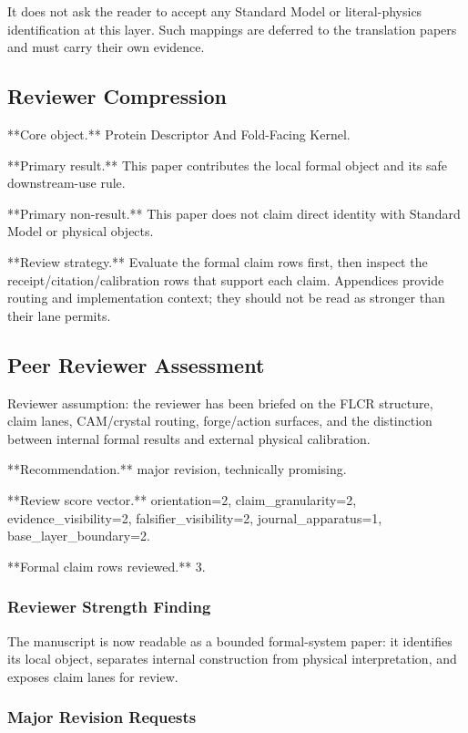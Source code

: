 \documentclass[11pt]{article}
\begin{document}
It does not ask the reader to accept any Standard Model or literal-physics identification at this layer. Such mappings are deferred to the translation papers and must carry their own evidence.

\subsection*{Reviewer Compression}

**Core object.** Protein Descriptor And Fold-Facing Kernel.

**Primary result.** This paper contributes the local formal object and its safe downstream-use rule.

**Primary non-result.** This paper does not claim direct identity with Standard Model or physical objects.

**Review strategy.** Evaluate the formal claim rows first, then inspect the receipt/citation/calibration rows that support each claim. Appendices provide routing and implementation context; they should not be read as stronger than their lane permits.

\subsection*{Peer Reviewer Assessment}

Reviewer assumption: the reviewer has been briefed on the FLCR structure, claim lanes, CAM/crystal routing, forge/action surfaces, and the distinction between internal formal results and external physical calibration.

**Recommendation.** major revision, technically promising.

**Review score vector.** orientation=2, claim\_granularity=2, evidence\_visibility=2, falsifier\_visibility=2, journal\_apparatus=1, base\_layer\_boundary=2.

**Formal claim rows reviewed.** 3.

\subsubsection*{Reviewer Strength Finding}

The manuscript is now readable as a bounded formal-system paper: it identifies its local object, separates internal construction from physical interpretation, and exposes claim lanes for review.

\subsubsection*{Major Revision Requests}
\end{document}
